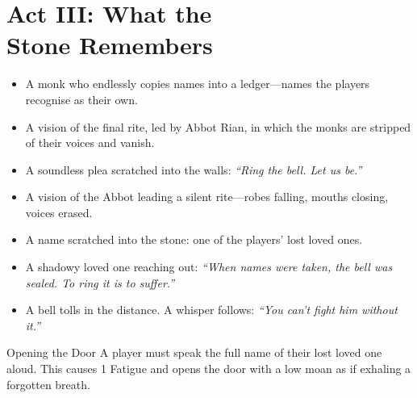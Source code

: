 \documentclass[nodeprecatedcode,bg=print]{dndbook}
\begin{document}
\section*{Act III: What the\\ Stone Remembers}
\begin{paracol}{3}

    \begin{Example}{}
    \begin{itemize}\raggedright
        \item A monk who endlessly copies names into a ledger—names the players recognise as their own.
        \item A vision of the final rite, led by Abbot Rian, in which the monks are stripped of their voices and vanish.
        \item A soundless plea scratched into the walls: \emph{“Ring the bell. Let us be.”}
    \end{itemize}
    \end{Example}


\switchcolumn


    \begin{Example}{}
        \begin{itemize}
            \item A vision of the Abbot leading a silent rite—robes falling, mouths closing, voices erased.
            \item A name scratched into the stone: one of the players’ lost loved ones.
            \item A shadowy loved one reaching out: \emph{“When names were taken, the bell was sealed. To ring it is to suffer.”}
            \item A bell tolls in the distance. A whisper follows: \emph{“You can’t fight him without it.”}
        \end{itemize}
    \end{Example}

\switchcolumn
    \begin{Example}{Opening the Door}
        A player must speak the full name of their lost loved one aloud. This causes 1 Fatigue and opens the door with a low moan as if exhaling a forgotten breath.
    \end{Example}
\end{paracol}
\end{document}

